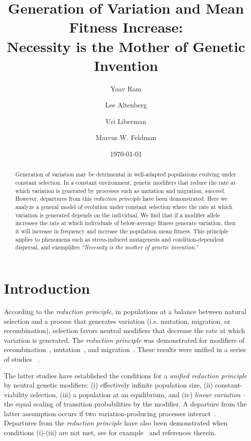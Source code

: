 \documentclass[9pt, a4paper, twocolumn]{extarticle}
\title{Generation of Variation and Mean Fitness Increase: \\ Necessity is the Mother of Genetic Invention}
\author[a]{Yoav Ram}
\author[b]{Lee Altenberg}
\author[c]{Uri Liberman}
\author[a]{Marcus W. Feldman}
\affil[a]{Department of Biology, Stanford University, Stanford, CA}
\affil[b]{Information and Computer Sciences, University of Hawai`i at M{\=a}noa, Honolulu, HI}
\affil[c]{School of Mathematical Sciences, Tel Aviv University, Israel}
\date{\today}
\begin{document}
\maketitle

\begin{abstract}
Generation of variation may be detrimental in well-adapted populations evolving under constant selection.
In a constant environment, genetic modifiers that reduce the rate at which variation is generated by processes such as mutation and migration, succeed.
However, departures from this \emph{reduction principle} have been demonstrated.
Here we analyze a general model of evolution under constant selection where the rate at which variation is generated depends on the individual.
We find that if a modifier allele increases the rate at which individuals of below-average fitness generate variation, then it will increase in frequency and increase the  population mean fitness. This principle applies to phenomena such as stress-induced mutagenesis and condition-dependent dispersal, and exemplifies \emph{``Necessity is the mother of genetic invention.''}
\end{abstract}

\section*{Introduction}

According to the \emph{reduction principle}, in populations at a balance between natural selection and a process that generates variation (i.e. mutation, migration, or recombination), selection favors neutral modifiers that decrease the rate at which variation is generated. 
The \emph{reduction principle} was demonstrated for modifiers of  recombination~\citep{Feldman1972}, mutation~\citep{Liberman1986a}, and migration~\citep{Feldman1986}.
These results were unified in a series of studies ~\citep{Altenberg1984,Altenberg1987,Altenberg2009,Altenberg2012b,Altenberg2012a,Altenberg2017}.

The latter studies have established the conditions for a \emph{unified reduction principle} by neutral genetic modifiers:
(i) effectively infinite population size, (ii) constant-viability selection, (iii) a population at an equilibrium, and (iv) \emph{linear variation} -- the equal scaling of transition probabilities by the modifier.
A departure from the latter assumption occurs if two variation-producing processes interact~\citep{Feldman1980,Altenberg2012b}.
Departures from the \emph{reduction principle} have also been demonstrated when conditions (i)-(iii) are not met, see for example~\citet{Holsinger1986} and references therein.
\end{document}
